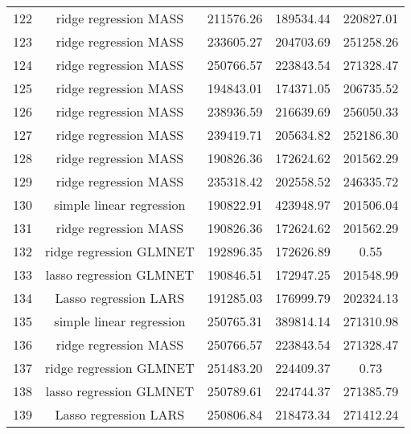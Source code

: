 \begin{tabular}{ccccc}
  122 & ridge regression MASS & 211576.26 & 189534.44 & 220827.01 \\ 
  123 & ridge regression MASS & 233605.27 & 204703.69 & 251258.26 \\ 
  124 & ridge regression MASS & 250766.57 & 223843.54 & 271328.47 \\ 
  125 & ridge regression MASS & 194843.01 & 174371.05 & 206735.52 \\ 
  126 & ridge regression MASS & 238936.59 & 216639.69 & 256050.33 \\ 
  127 & ridge regression MASS & 239419.71 & 205634.82 & 252186.30 \\ 
  128 & ridge regression MASS & 190826.36 & 172624.62 & 201562.29 \\ 
  129 & ridge regression MASS & 235318.42 & 202558.52 & 246335.72 \\ 
  130 & simple linear regression & 190822.91 & 423948.97 & 201506.04 \\ 
  131 & ridge regression MASS & 190826.36 & 172624.62 & 201562.29 \\ 
  132 & ridge regression GLMNET & 192896.35 & 172626.89 & 0.55 \\ 
  133 & lasso regression GLMNET & 190846.51 & 172947.25 & 201548.99 \\ 
  134 & Lasso regression LARS & 191285.03 & 176999.79 & 202324.13 \\ 
  135 & simple linear regression & 250765.31 & 389814.14 & 271310.98 \\ 
  136 & ridge regression MASS & 250766.57 & 223843.54 & 271328.47 \\ 
  137 & ridge regression GLMNET & 251483.20 & 224409.37 & 0.73 \\ 
  138 & lasso regression GLMNET & 250789.61 & 224744.37 & 271385.79 \\ 
  139 & Lasso regression LARS & 250806.84 & 218473.34 & 271412.24 \\ 
   \hline
\end{tabular}
